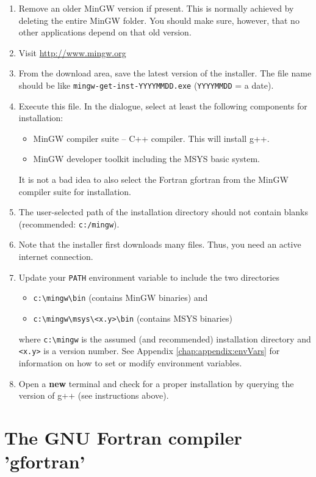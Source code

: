 \begin{enumerate}
  \item Remove an older MinGW version if present. This is normally achieved by deleting the entire MinGW folder. You should make sure, however, that no other applications depend on that old version.
  \item Visit \url{http://www.mingw.org}
  \item From the download area, save the latest version of the installer. The file name should be like \verb!mingw-get-inst-YYYYMMDD.exe! (\verb!YYYYMMDD! = a date).
  \item Execute this file. In the dialogue, select at least the following components for installation:
    \begin{itemize}
      \item MinGW compiler suite -- C++ compiler. This will install g++.
      \item MinGW developer toolkit including the MSYS basic system.
    \end{itemize}
  It is not a bad idea to also select the Fortran gfortran from the MinGW compiler suite for installation.
  \item The user-selected path of the installation directory should not contain blanks (recommended: \verb!c:/mingw!).
  \item Note that the installer first downloads many files. Thus, you need an active internet connection.
  \item Update your \verb!PATH! environment variable to include the two directories
    \begin{itemize}
      \item \verb!c:\mingw\bin! (contains MinGW binaries) and
      \item \verb!c:\mingw\msys\<x.y>\bin! (contains MSYS binaries)
    \end{itemize}
   where \verb!c:\mingw! is the assumed (and recommended) installation directory and \verb!<x.y>! is a version number. See Appendix \ref{chap:appendix:envVars} for information on how to set or modify environment variables.
  \item Open a \textbf{new} terminal and check for a proper installation by querying the version of g++ (see instructions above).
\end{enumerate}


\section{The GNU Fortran compiler 'gfortran'} \label{sec:extSoft:gfortran}

